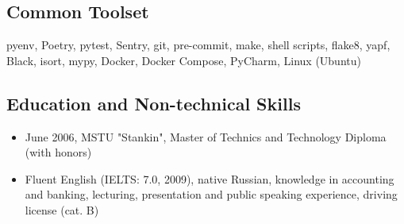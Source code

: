 \documentclass[a4paper,8pt]{extarticle}
\begin{document}
\subsection*{\hypertarget{common-toolset}{Common Toolset}}
pyenv, Poetry, pytest, Sentry, git, pre-commit, make, shell scripts, flake8, yapf, Black, isort, mypy, Docker, Docker Compose, PyCharm, Linux (Ubuntu)

\subsection*{Education and Non-technical Skills}
\begin{itemize}
    \item June 2006, MSTU "Stankin", Master of Technics and Technology Diploma (with honors)
    \item Fluent English (IELTS: 7.0, 2009), native Russian, knowledge in accounting and banking, lecturing, presentation and public speaking experience, driving license (cat. B)
\end{itemize}
\end{document}
